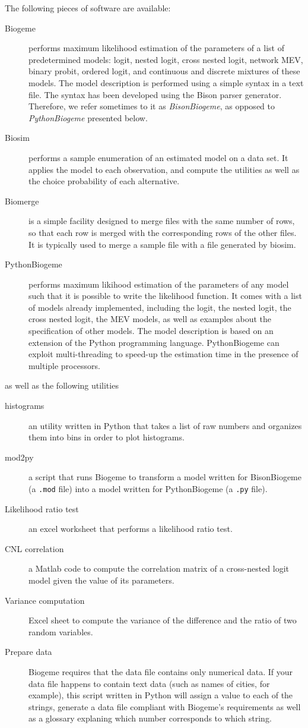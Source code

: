\documentclass[12pt]{memoir}
\begin{document}
The following pieces of software are available:
\begin{description}
\item[Biogeme] performs maximum likelihood estimation of the parameters of a list of predetermined models: logit, nested logit, cross nested logit, network MEV, binary probit,  ordered logit, and continuous and discrete mixtures of these models. The model description is performed using a simple syntax in a text file. The syntax has been developed using the Bison parser generator. Therefore, we refer sometimes to it as \emph{BisonBiogeme}, as opposed to \emph{PythonBiogeme} presented below. 
\item[Biosim] performs a sample enumeration of an estimated model on a data set. It applies the model to each observation, and compute the utilities as well as the choice probability of each alternative. 
\item[Biomerge] is a simple facility designed to merge files with the
  same number of rows, so that each row is merged with the
  corresponding rows of the other files. It is typically used to merge
  a sample file with a file generated by biosim.  
\item[PythonBiogeme] performs maximum likihood estimation of the
  parameters of any model such that it is possible to write the
  likelihood function. It comes with a list of models already
  implemented, including the logit, the nested logit, the cross nested
  logit, the MEV models, as well as examples about the specification
  of other models. The model description is based on an extension of
  the Python programming language.  PythonBiogeme can exploit multi-threading to speed-up the estimation time in the presence of multiple processors. 
\end{description}
as well as the following utilities 
\begin{description}
\item[histograms] an utility written in Python that takes a list of raw numbers and
  organizes them into bins in order to plot histograms. 
\item[mod2py] a script that runs Biogeme to transform a model written for
  BisonBiogeme (a \texttt{.mod} file) into a model written for
  PythonBiogeme (a \texttt{.py} file). 
\item[Likelihood ratio test] an excel worksheet that performs a
  likelihood ratio test.
\item[CNL correlation] a Matlab code to compute the correlation matrix of a cross-nested logit model given the value of its parameters. 
\item[Variance computation] Excel sheet  to compute the
  variance of the difference and the ratio of two random variables.   
\item[Prepare data] Biogeme requires that the data file contains only
  numerical data. If your data file happens to contain text data (such
  as names of cities, for example), this script written in Python will
  assign a value to each of the strings, generate a data file compliant
  with Biogeme's requirements as well as a glossary explaning which
  number corresponds to which string. 
\end{description}
\end{document}
